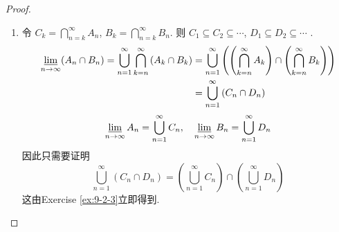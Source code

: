 \documentclass[../main.tex]{subfiles}
\begin{document}
\begin{proof}
\begin{enumerate}
\[    \]此外\[
    \bigcup _{n = 1}^{\infty}\left( C_{n}^{c}\cap D_{n}^{c} \right)= \bigcup _{n = 1}^{\infty}\left( C_{n}\cup D_{n} \right)^{c}=  \left( \bigcap_{n = 1}^{\infty}\left( C_{n}\cup D_{n} \right)     \right)^{c} 
    \](*)两边的补集相等, 从而(*)成立.
    \item 令 \(  C_{k}= \bigcap_{n = k}^{\infty}A_{n}   \), \(  B_{k}= \bigcap_{ n = k}^{\infty}B_{n}   \). 则 \(  C_1\subseteq C_2\subseteq \cdots   \), \(  D_1\subseteq D_2\subseteq \cdots   \)    . \[
   \begin{aligned}
    \varliminf_{n\to\infty} (A_n \cap B_n) = \bigcup _{n = 1}^{\infty}\bigcap_{k= n}^{\infty}\left( A_{k}\cap  B_{k} \right)&=   \bigcup _{n = 1}^{\infty} \left( \left( \bigcap_{k= n}^{\infty}A_{k}  \right)\cap \left( \bigcap_{k= n}^{\infty}B_{k}  \right)  \right)\\ 
     &= \bigcup _{n = 1}^{\infty}\left( C_{n}\cap D_{n} \right) 
   \end{aligned}  
    \] \[
    \varliminf_{n\to\infty} A_n = \bigcup _{n = 1}^{\infty}C_{n},\quad  \varliminf_{n\to\infty} B_n = \bigcup _{n = 1}^{\infty}D_{n}
    \]因此只需要证明 \[
    \bigcup _{n = 1}^{\infty}\left( C_{n}\cap D_{n} \right)=  \left( \bigcup _{n = 1}^{\infty}C_{n} \right)\cap \left( \bigcup _{n = 1}^{\infty}D_{n} \right)   
    \]这由Exercise \ref{ex:9-2-3}立即得到.
    \end{enumerate}
    
\end{proof}
\end{document}
